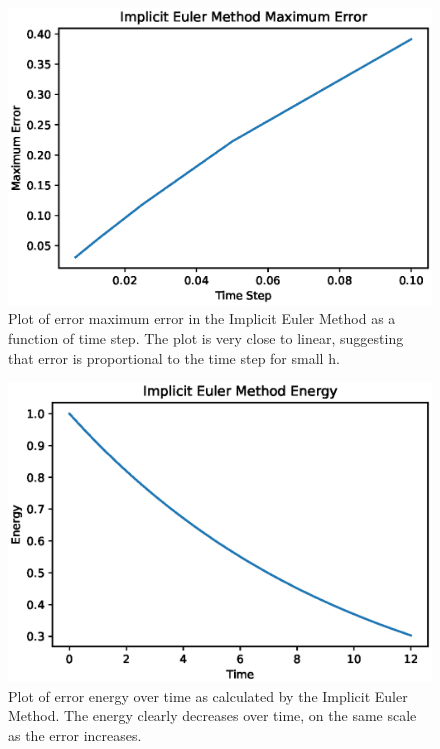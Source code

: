 \documentclass{article}
\begin{document}
\begin{figure}[ht]
\centering
\includegraphics[scale=0.35]{imp_euler_max_err.eps}
\caption{Plot of error maximum error in the Implicit Euler Method as a function of time step. The plot is very close to linear, suggesting that error is proportional to the time step for small h.}
\label{fig:impeulermaxerr}
\end{figure}

\begin{figure}[ht]
\centering
\includegraphics[scale=0.35]{imp_euler_energy.eps}
\caption{Plot of error energy over time as calculated by the Implicit Euler Method. The energy clearly decreases over time, on the same scale as the error increases.}
\label{fig:impeulerenergy}
\end{figure}
\end{document}
